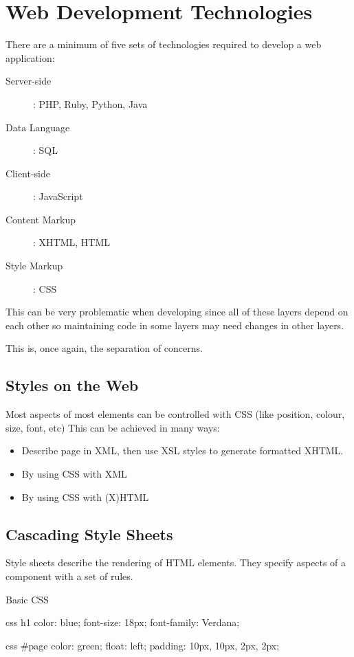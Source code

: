 \section{Web Development Technologies}\label{sec:web_development_technologies}

There are a minimum of five sets of technologies required to develop a web application:

\begin{description}
	\item[Server-side]: PHP, Ruby, Python, Java
	\item[Data Language]: SQL
	\item[Client-side]: JavaScript
	\item[Content Markup]: XHTML, HTML
	\item[Style Markup]: CSS
\end{description}
This can be very problematic when developing since all of these layers depend on each other so maintaining code in some layers may need changes in other layers.

This is, once again, the separation of concerns.

\subsection{Styles on the Web}\label{sub:styles_on_the_web}

Most aspects of most elements can be controlled with CSS (like position, colour, size, font, etc)
This can be achieved in many ways:
\begin{itemize}
	\item Describe page in XML, then use XSL styles to generate formatted XHTML.
	\item By using CSS with XML
	\item By using CSS with (X)HTML
\end{itemize}

\subsection{Cascading Style Sheets}\label{sub:cascading_style_sheets}

Style sheets describe the rendering of HTML elements.
They specify aspects of a component with a set of rules.

\medskip
\begin{highlight}{Basic CSS}
	\begin{minipage}{0.45\linewidth}
		\begin{code}{css}
			h1 {
                color: blue;
                font-size: 18px;
                font-family: Verdana;
            }
		\end{code}
	\end{minipage}
	\hfill
	\begin{minipage}{0.45\linewidth}
		\begin{code}{css}
			#page {
                color: green;
                float: left;
                padding: 10px, 10px, 2px, 2px;
			}
		\end{code}
	\end{minipage}
\end{highlight}

